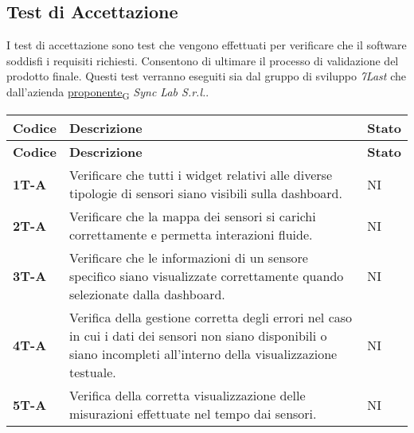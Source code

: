 \subsection{Test di Accettazione}
I test di accettazione sono test che vengono effettuati per verificare che il software soddisfi i requisiti richiesti. Consentono di ultimare il processo di validazione del prodotto finale. Questi test verranno eseguiti sia dal gruppo di sviluppo \textit{7Last} che dall'azienda \href{https://7last.github.io/docs/rtb/documentazione-interna/glossario\#proponente}{proponente\textsubscript{G}} \textit{Sync Lab S.r.l.}. \\
\begin{longtable}{|>{\raggedright\arraybackslash}m{}|>{\raggedright\arraybackslash}m{}|>{\raggedright\arraybackslash}m{}|}
	\hline
	\textbf{Codice} & \textbf{Descrizione}                                                                                                                                                  & \textbf{Stato} \\
	\hline
	\endfirsthead
	\hline
	\textbf{Codice} & \textbf{Descrizione}                                                                                                                                                  & \textbf{Stato} \\
	\endhead
	\textbf{1T-A}   & Verificare che tutti i widget relativi alle diverse tipologie di sensori siano visibili sulla dashboard.                                                              & NI             \\
	\hline
	\textbf{2T-A}   & Verificare che la mappa dei sensori si carichi correttamente e permetta interazioni fluide.                                                                           & NI             \\
	\hline
	\textbf{3T-A}   & Verificare che le informazioni di un sensore specifico siano visualizzate correttamente quando selezionate dalla dashboard.                                           & NI             \\
	\hline
	\textbf{4T-A}   & Verifica della gestione corretta degli errori nel caso in cui i dati dei sensori non siano disponibili o siano incompleti all’interno della visualizzazione testuale. & NI             \\
	\hline
	\textbf{5T-A}   & Verifica della corretta visualizzazione delle misurazioni effettuate nel tempo dai sensori.                                                                           & NI             \\

\end{longtable}
